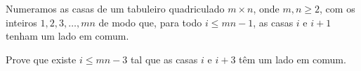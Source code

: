 Numeramos as casas de um tabuleiro quadriculado $m \times n$, onde $m, n \ge 2$, com os inteiros $1, 2, 3, \dots, mn$ de modo que, para todo $i \le mn - 1$, as casas $i$ e $i + 1$ tenham um lado em comum.

Prove que existe $i \le mn - 3$ tal que as casas $i$ e $i + 3$ têm um lado em comum.